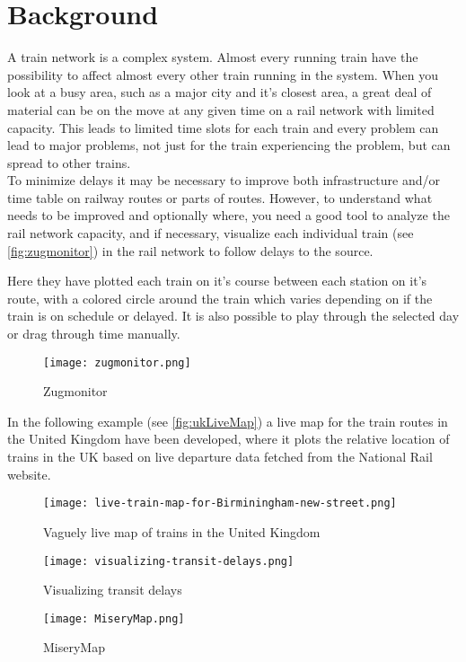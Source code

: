 
\chapter{Background}



A train network is a complex system. Almost every running train have the 
possibility to affect almost every other train running in the system.  When you look at a busy area, such as a major city and it's closest
area, a great deal of material can be on the move at any given time on a
rail network with limited capacity. This leads to limited time slots for each train and every
problem can lead to major problems, not just for the train experiencing the
problem, but can spread to other trains. \\

To minimize delays it may be necessary to improve both infrastructure and/or
time table on railway routes or parts of routes. However, to understand what
needs to be improved and optionally where, you need a good tool to analyze the
rail network capacity, and if necessary, visualize each individual train (see \vref{fig:zugmonitor}) in the rail network to follow delays to the source.

Here they have plotted each train on it's course between each station on it's
route, with a colored circle around the train which varies depending on if the
train is on schedule or delayed. It is also possible to play through the
selected day or drag through time manually.

\begin{figure}[!htbp]
	\texttt{[image: zugmonitor.png]}
	\caption[Zugmonitor]{Zugmonitor \cite{zugmonitor}}
	\label{fig:zugmonitor}
\end{figure}

In the following example (see \vref{fig:ukLiveMap}) a live map for the train routes in the United Kingdom have been developed, where it plots the relative location of trains in the UK based on live departure data fetched from the National Rail website.

\begin{figure}[!htbp]
	\texttt{[image: live-train-map-for-Birminingham-new-street.png]}
	\caption[Vaguely live map of trains in the United Kingdom]{Vaguely live map of trains in the United Kingdom \cite{ukLiveMap}}
	\label{fig:ukLiveMap}
\end{figure}

\begin{figure}[!htbp]
	\texttt{[image: visualizing-transit-delays.png]}
	\caption[Visualizing transit delays]{Visualizing transit delays \cite{muniLightRail}}
	\label{fig:muniLightRail}
\end{figure}

\begin{figure}[!htbp]
	\texttt{[image: MiseryMap.png]}
	\caption[MiseryMap]{MiseryMap \cite{flightAware:MiseryMap}}
	\label{fig:miserymap}
\end{figure}
 
